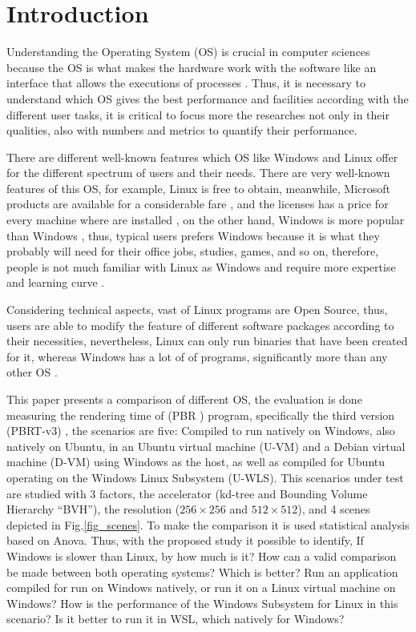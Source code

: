 \documentclass[conference]{IEEEtran}
\begin{document}
\section{Introduction}
Understanding the Operating System (OS) is crucial in computer sciences because the OS is what makes the
hardware work with the software like an
interface that allows the executions of processes \cite{dhamija2012demographics}. Thus, it is necessary to understand which OS gives the best performance and facilities according with the different user tasks, it is critical to focus more the researches not only in their qualities, also with numbers and metrics to quantify their performance. \par
There are different well-known features which OS like Windows and Linux offer for the different spectrum of users and their needs. There are very well-known features of this OS, for example, Linux is free to obtain, meanwhile, Microsoft products are available for a considerable fare \cite{dhamija2012demographics}, and the licenses has a price for every machine where are installed  \cite{duran2006analisis}, on the other hand, Windows is more popular than Windows \cite{duran2006analisis}, thus, typical users prefers Windows because it is what they probably will need for their office jobs, studies, games, and so on, therefore, people is not much familiar with Linux as Windows and require more expertise and learning curve \cite{dhamija2012demographics}.\par
Considering technical aspects, vast of Linux programs are Open Source, thus, users are able to modify the feature of different software packages according to their necessities, nevertheless, Linux can only run binaries that have been  created for it, whereas Windows has a lot of of programs, significantly more than any other OS \cite{dhamija2012demographics}.\par


This paper presents a comparison of different OS, the evaluation is done measuring the rendering time of (PBR \cite{PBR}) program, specifically the third version (PBRT-v3) \cite{PBRT}, the scenarios are five: Compiled to run natively on Windows, also natively on Ubuntu, in an Ubuntu virtual machine (U-VM) and a Debian virtual machine (D-VM) using Windows as the host, as well as compiled for Ubuntu operating on the Windows Linux Subsystem (U-WLS). This scenarios under test are studied with 3 factors, the accelerator (kd-tree and Bounding Volume Hierarchy ``BVH''), the resolution ($256 \times 256$ and $512 \times 512$), and 4 scenes depicted in Fig.\ref{fig_scenes}. To make the comparison it is used statistical analysis based on Anova. 
Thus, with the proposed study it possible to identify, If Windows is slower than Linux, by how much is it? How can a valid comparison be made between
both operating systems? Which is better? Run an application compiled for
run on Windows natively, or run it on a
Linux virtual machine on Windows? How is the performance of the Windows Subsystem for 
Linux in this scenario? Is it better to run it in WSL,
which natively for Windows?
\end{document}
